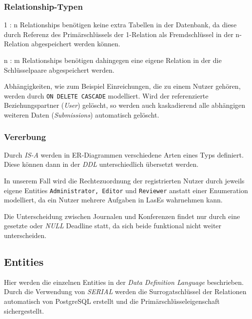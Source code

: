 \subsubsection{Relationship-Typen}

1 : n Relationships benötigen keine extra Tabellen in der Datenbank, da diese durch Referenz des Primärschlüssels der 1-Relation als Fremdschlüssel in der n-Relation abgespeichert werden können.

n : m Relationships benötigen dahingegen eine eigene Relation in der die Schlüsselpaare abgespeichert werden.

Abhängigkeiten, wie zum Beispiel Einreichungen, die zu einem Nutzer gehören, werden durch \texttt{ON DELETE CASCADE} modelliert. Wird der referenzierte Beziehungspartner (\emph{User}) gelöscht, so werden auch kaskadierend alle abhängigen weiteren Daten (\emph{Submissions}) automatisch gelöscht.

\subsubsection{Vererbung}

Durch \emph{IS-A} werden in ER-Diagrammen verschiedene Arten eines Typs definiert. Diese können dann in der \emph{DDL} unterschiedlich übersetzt werden.

In unserem Fall wird die Rechtezuordnung der registrierten Nutzer durch jeweils eigene Entities \texttt{Administrator, Editor} und \texttt{Reviewer} anstatt einer Enumeration modelliert, da ein Nutzer mehrere Aufgaben in LasEs wahrnehmen kann.

Die Unterscheidung zwischen Journalen und Konferenzen findet nur durch eine gesetzte oder \emph{NULL} Deadline statt, da sich beide funktional nicht weiter unterscheiden.

\subsection{Entities}

Hier werden die einzelnen Entities in der \emph{Data Definition Language} beschrieben. Durch die Verwendung von \emph{SERIAL} werden die Surrogatschlüssel der Relationen automatisch von PostgreSQL erstellt und die Primärschlüsseleigenschaft sichergestellt.\\


